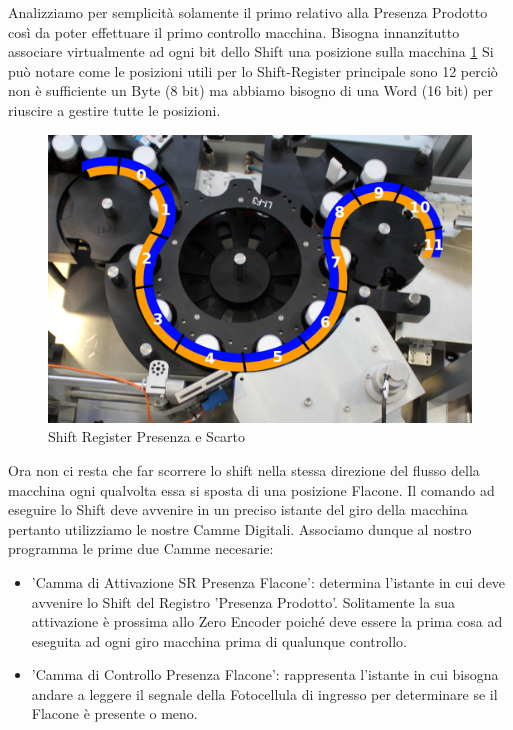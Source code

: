 \documentclass[12pt, a4paper, oneside]{book}
\begin{document}
Analizziamo per semplicità solamente il primo relativo alla Presenza Prodotto così da poter effettuare il primo controllo macchina. Bisogna innanzitutto associare virtualmente ad ogni bit dello Shift una posizione sulla macchina \ref{sh2} Si può notare come le posizioni utili per lo Shift-Register principale sono 12 perciò non è sufficiente un Byte (8 bit) ma abbiamo bisogno di una Word (16 bit) per riuscire a gestire tutte le posizioni.

\begin{figure}[H]
	\centering
	\includegraphics[width=12cm]{Immagini/SH2}
	\caption{Shift Register Presenza e Scarto}
	\label{sh2}
\end{figure}

Ora non ci resta che far scorrere lo shift nella stessa direzione del flusso della macchina ogni qualvolta essa si sposta di una posizione Flacone. Il comando ad eseguire lo Shift deve avvenire in un preciso istante del giro della macchina pertanto utilizziamo le nostre Camme Digitali. Associamo dunque al nostro programma le prime due Camme necesarie:

\begin{itemize}
	\item 'Camma di Attivazione SR Presenza Flacone': determina l'istante in cui deve avvenire lo Shift del Registro 'Presenza Prodotto'. Solitamente la sua attivazione è prossima allo Zero Encoder poiché deve essere la prima cosa ad eseguita ad ogni giro macchina prima di qualunque controllo.
	\item 'Camma di Controllo Presenza Flacone': rappresenta l'istante in cui bisogna andare a leggere il segnale della Fotocellula di ingresso per determinare se il Flacone è presente o meno.
\end{itemize}
\end{document}
